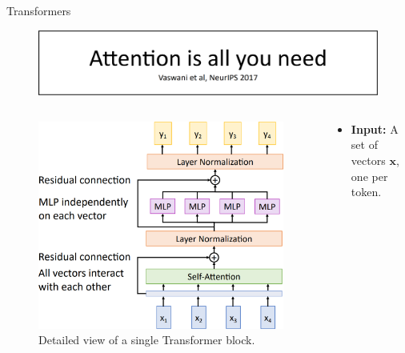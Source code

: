 \begin{frame}[allowframebreaks]{Transformers}
    \begin{figure}
        \centering
        \includegraphics[width=\linewidth,height=\textheight,keepaspectratio]{images/transformers/slide_55_1_img.png}
    \end{figure}

    \framebreak

    \begin{columns}
        \begin{column}{0.55\textwidth}
            \begin{figure}
                \flushleft
                \includegraphics[width=\linewidth,height=\textheight,keepaspectratio]{images/transformers/slide_56_1_img.png}
                \caption{Detailed view of a single Transformer block.}
            \end{figure}
        \end{column}
        \begin{column}{0.45\textwidth}
            \begin{itemize}
                \item \textbf{Input:} A set of vectors $\mathbf{x}$, one per token.

\end{itemize}
\end{column}
\end{columns}
\end{frame}
